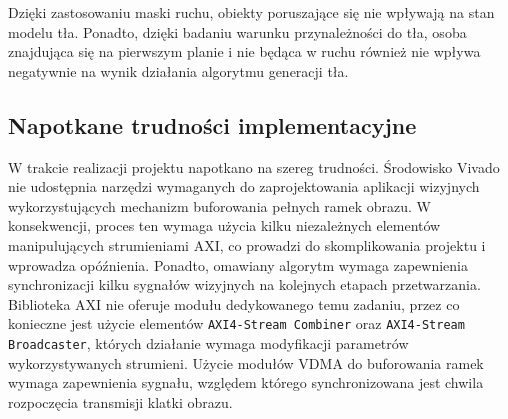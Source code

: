Dzięki zastosowaniu maski ruchu, obiekty poruszające się nie wpływają na stan modelu tła. Ponadto, dzięki badaniu warunku przynależności do tła, osoba znajdująca się na pierwszym planie i nie będąca w ruchu również nie wpływa negatywnie na wynik działania algorytmu generacji tła.





\subsection*{Napotkane trudności implementacyjne}
W trakcie realizacji projektu napotkano na szereg trudności. Środowisko Vivado nie udostępnia narzędzi wymaganych do zaprojektowania aplikacji wizyjnych wykorzystujących mechanizm buforowania pełnych ramek obrazu. W konsekwencji, proces ten wymaga użycia kilku niezależnych elementów manipulujących strumieniami AXI, co prowadzi do skomplikowania projektu i wprowadza opóźnienia.
Ponadto, omawiany algorytm wymaga zapewnienia synchronizacji kilku sygnałów wizyjnych na kolejnych etapach przetwarzania. Biblioteka AXI nie oferuje modułu dedykowanego temu zadaniu, przez co konieczne jest użycie elementów \texttt{AXI4-Stream Combiner} oraz \texttt{AXI4-Stream Broadcaster}, których działanie wymaga modyfikacji parametrów wykorzystywanych strumieni.
Użycie modułów VDMA do buforowania ramek wymaga zapewnienia sygnału, względem którego synchronizowana jest chwila rozpoczęcia transmisji klatki obrazu.

